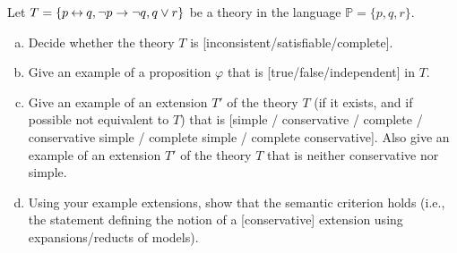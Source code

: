 \begin{problem}\label{problem:properties-of-theories}

    Let $T=\{p\mathbin{\leftrightarrow} q,\neg p\to\neg q,q\lor r\}$ be a theory in the language $\mathbb P=\{p,q,r\}$.
    \begin{enumerate}[(a)]
        \item Decide whether the theory $T$ is [inconsistent/satisfiable/complete].
        \item Give an example of a proposition $\varphi$ that is [true/false/independent] in $T$.
        \item Give an example of an extension $T'$ of the theory $T$ (if it exists, and if possible not equivalent to $T$) that is [simple / conservative / complete / conservative simple / complete simple / complete conservative]. Also give an example of an extension $T'$ of the theory $T$ that is neither conservative nor simple.
        \item Using your example extensions, show that the semantic criterion holds (i.e., the statement defining the notion of a [conservative] extension using expansions/reducts of models).
    \end{enumerate}


\end{problem}
